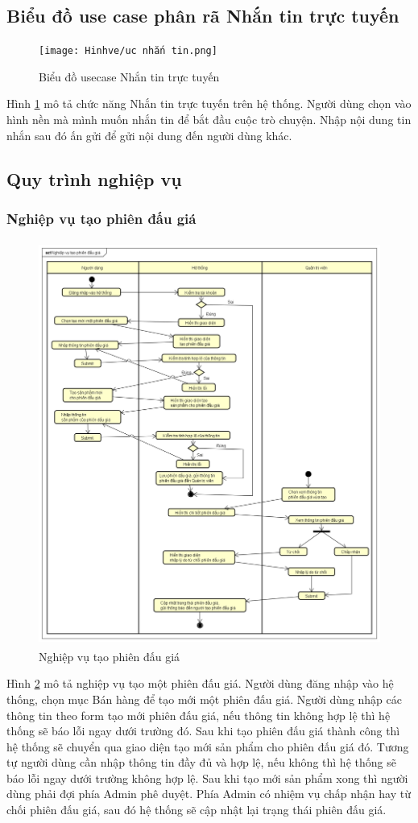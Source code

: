 \documentclass[../DoAn.tex]{subfiles}
\begin{document}
\subsection{Biểu đồ use case phân rã Nhắn tin trực tuyến}
\label{subsection:2.2.6}
\begin{figure}[H]
    \centering
    \texttt{[image: Hinhve/uc nhắn tin.png]}
    \caption{Biểu đồ usecase Nhắn tin trực tuyến}
    \label{fig:Fig26}
\end{figure}
Hình \ref{fig:Fig26} mô tả chức năng Nhắn tin trực tuyến trên hệ thống. Người dùng chọn vào hình nền mà mình muốn nhắn tin để bắt đầu cuộc trò chuyện. Nhập nội dung tin nhắn sau đó ấn gửi để gửi nội dung đến người dùng khác. 
\subsection{Quy trình nghiệp vụ}
\label{subsection:2.2.7}
\subsubsection{Nghiệp vụ tạo phiên đấu giá}
\label{subsubsection:2.2.7.1}
\begin{figure}[H]
    \centering
    \includegraphics[width=11.4cm,height=13.28cm]{Hinhve/nghiệp vụ tạo phiên đấu giá.png}
    \caption{Nghiệp vụ tạo phiên đấu giá}
    \label{fig:Fig27}
\end{figure}
Hình \ref{fig:Fig27} mô tả nghiệp vụ tạo một phiên đấu giá. Người dùng đăng nhập vào hệ thống, chọn mục Bán hàng để tạo mới một phiên đấu giá. Người dùng nhập các thông tin theo form tạo mới phiên đấu giá, nếu thông tin không hợp lệ thì hệ thống sẽ báo lỗi ngay dưới trường đó. Sau khi tạo phiên đấu giá thành công thì hệ thống sẽ chuyển qua giao diện tạo mới sản phẩm cho phiên đấu giá đó. Tương tự người dùng cần nhập thông tin đầy đủ và hợp lệ, nếu không thì hệ thống sẽ báo lỗi ngay dưới trường không hợp lệ. Sau khi tạo mới sản phẩm xong thì người dùng phải đợi phía Admin phê duyệt. Phía Admin có nhiệm vụ chấp nhận hay từ chối phiên đấu giá, sau đó hệ thống sẽ cập nhật lại trạng thái phiên đấu giá.
\end{document}

